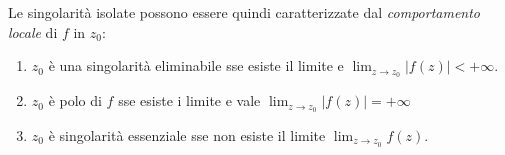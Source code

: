 \begin{remark}
  Le singolarità isolate possono essere quindi caratterizzate dal
  \emph{comportamento locale} di $f$ in $z_0$: 
  \begin{enumerate}
    \item $z_0$ è una singolarità eliminabile sse esiste il limite e 
      $\lim_{z \to z_0} |f(z)| < +\infty$.
    \item $z_0$ è polo di $f$ sse esiste i limite e vale $\lim_{z\to
      z_0}|f(z)| = +\infty$
    \item $z_0$ è singolarità essenziale sse non esiste il limite
      $\lim_{z \to z_0} f(z)$. 
  \end{enumerate}
  \label{rmk:comportamento_locale_singolarita}
\end{remark}
